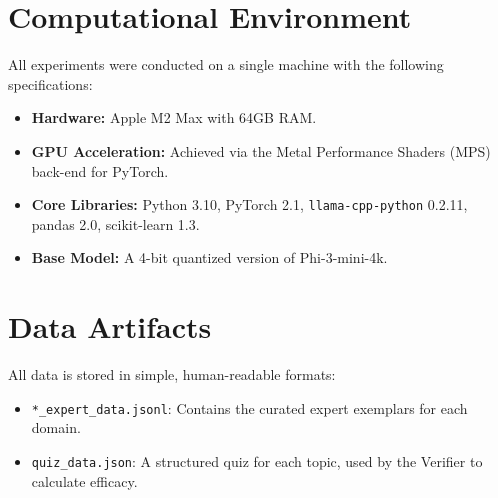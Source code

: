 \section{Computational Environment}
All experiments were conducted on a single machine with the following specifications:

\begin{itemize}[leftmargin=*]
    \item \textbf{Hardware:} Apple M2 Max with 64GB RAM.
    \item \textbf{GPU Acceleration:} Achieved via the Metal Performance Shaders (MPS) back-end for PyTorch.
    \item \textbf{Core Libraries:} Python 3.10, PyTorch 2.1, \texttt{llama-cpp-python} 0.2.11, pandas 2.0, scikit-learn 1.3.
    \item \textbf{Base Model:} A 4-bit quantized version of Phi-3-mini-4k.
\end{itemize}

\section{Data Artifacts}
All data is stored in simple, human-readable formats:

\begin{itemize}[leftmargin=*]
    \item \texttt{*\_expert\_data.jsonl}: Contains the curated expert exemplars for each domain.
    \item \texttt{quiz\_data.json}: A structured quiz for each topic, used by the Verifier to calculate efficacy.
\end{itemize}
